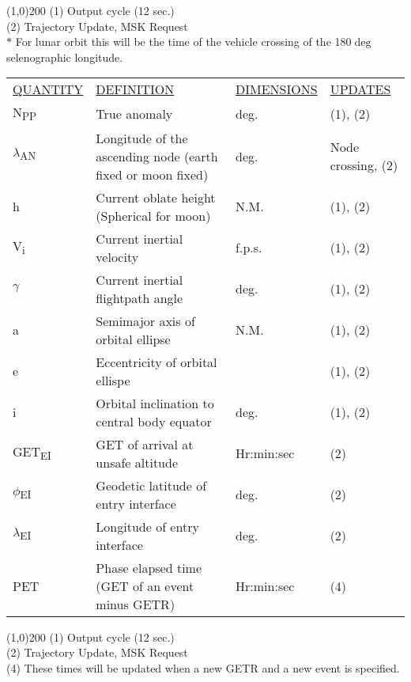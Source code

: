 \documentclass[11pt]{article} %
\begin{document}
\line(1,0){200}
(1) Output cycle (12 sec.)\\
(2) Trajectory Update, MSK Request\\
$\ast$ For lunar orbit this will be the time of the vehicle crossing of the 180$\deg$ selenographic longitude.\\
\newpage
\begin{center}
\begin{tabular}{ L{3cm} L{4.5cm} L{3cm} L{3.8cm} }
 \underline{QUANTITY} & \underline{DEFINITION} & \underline{DIMENSIONS} & \underline{UPDATES} \\ 
N\textsubscript{PP}&True anomaly&deg.&(1), (2)\\
$\lambda$\textsubscript{AN}&Longitude of the ascending node (earth fixed or moon fixed)&deg.&Node crossing, (2)\\
h&Current oblate height (Spherical for moon)&N.M.&(1), (2)\\
V\textsubscript{i}&Current inertial velocity&f.p.s.&(1), (2)\\
$\gamma$&Current inertial flightpath angle&deg.&(1), (2)\\
a&Semimajor axis of orbital ellipse&N.M.&(1), (2)\\
e&Eccentricity of orbital ellispe&&(1), (2)\\
i&Orbital inclination to central body equator&deg.&(1), (2)\\
GET\textsubscript{EI}&GET of arrival at unsafe altitude&Hr:min:sec&(2)\\
$\phi$\textsubscript{EI}&Geodetic latitude of entry interface&deg.&(2)\\
$\lambda$\textsubscript{EI}&Longitude of entry interface&deg.&(2)\\
PET&Phase elapsed time (GET of an event minus GETR)&Hr:min:sec&(4)\\
\end{tabular}
\end{center}

\line(1,0){200}
(1) Output cycle (12 sec.)\\
(2) Trajectory Update, MSK Request\\
(4) These times will be updated when a new GETR and a new event is specified.\\
\newpage
\end{document}
